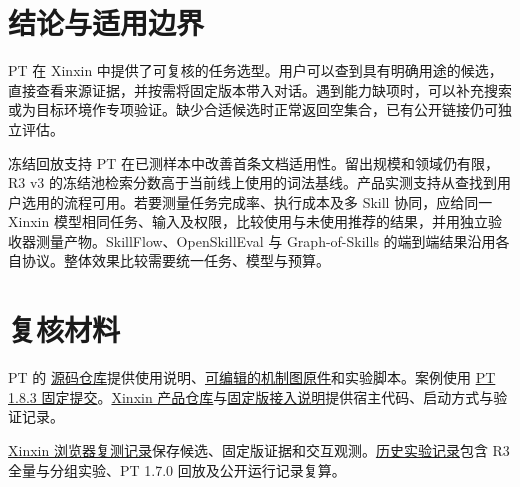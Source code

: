 \documentclass[final,5p,twocolumn,10pt]{elsarticle}
\newcommand{\ptRepo}{https://github.com/qing1989620/pan-bie-qi}
\newcommand{\xinxinRepo}{https://github.com/qing1989620/xinxin-local}
\begin{document}
\section{结论与适用边界}

PT 在 Xinxin 中提供了可复核的任务选型。用户可以查到具有明确用途的候选，直接查看来源证据，并按需将固定版本带入对话。遇到能力缺项时，可以补充搜索或为目标环境作专项验证。缺少合适候选时正常返回空集合，已有公开链接仍可独立评估。

冻结回放支持 PT 在已测样本中改善首条文档适用性。留出规模和领域仍有限，R3 v3 的冻结池检索分数高于当前线上使用的词法基线。产品实测支持从查找到用户选用的流程可用。若要测量任务完成率、执行成本及多 Skill 协同，应给同一 Xinxin 模型相同任务、输入及权限，比较使用与未使用推荐的结果，并用独立验收器测量产物。SkillFlow、OpenSkillEval 与 Graph-of-Skills 的端到端结果沿用各自协议\cite{skillflow,open,graph}。整体效果比较需要统一任务、模型与预算。

\section*{复核材料}

PT 的 \href{\ptRepo}{源码仓库}提供使用说明、\href{\ptRepo/blob/main/docs/figures/pt-framework-v1.7.0.pptx}{可编辑的机制图原件}和实验脚本。案例使用 \href{\ptRepo/tree/7b60ead08c07486e4d1e5462a8ea4c104742e0b2}{PT 1.8.3 固定提交}。\href{\xinxinRepo}{Xinxin 产品仓库}与\href{\xinxinRepo/blob/5c870edfb649409f876b04ce364c8f8ab1f17009/docs/pt-chat-recommendations.md}{固定版接入说明}提供宿主代码、启动方式与验证记录。

\href{\ptRepo/blob/main/docs/results/pt-xinxin-live-2026-11-28.json}{Xinxin 浏览器复测记录}保存候选、固定版证据和交互观测。\href{\ptRepo/tree/main/docs/results}{历史实验记录}包含 R3 全量与分组实验、PT 1.7.0 回放及公开运行记录复算。
\end{document}
